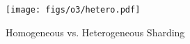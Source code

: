 \begin{figure}[tbp]
    \centering
    \texttt{[image: figs/o3/hetero.pdf]}

    \caption{
        Homogeneous vs. Heterogeneous Sharding 
    }

    \label{fig:hetero}
\end{figure}
